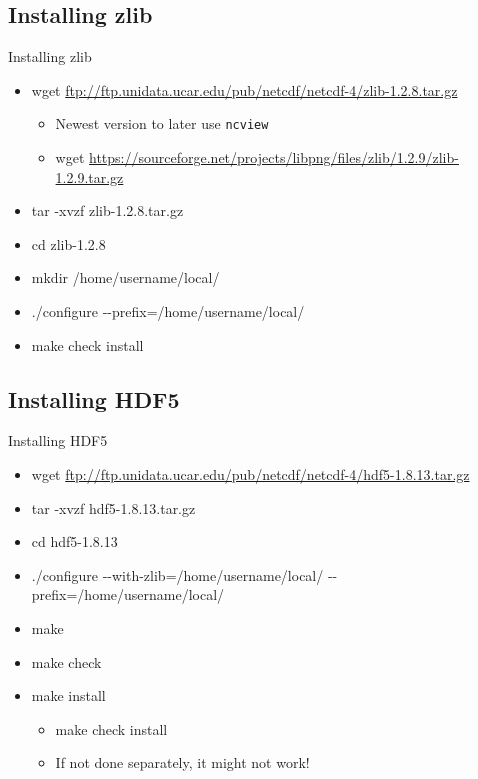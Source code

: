 \documentclass[compress,11pt,xcolor=svgnames,aspectratio=169]{beamer}
\begin{document}
\subsection{Installing zlib}

\begin{frame}[fragile]{Installing zlib}

\begin{itemize}
\setlength\itemsep{0.3cm}

  \item {\footnotesize wget \url{ftp://ftp.unidata.ucar.edu/pub/netcdf/netcdf-4/zlib-1.2.8.tar.gz}}
  \begin{itemize}
    \item Newest version to later use \texttt{ncview}
    \item {\scriptsize wget \url{https://sourceforge.net/projects/libpng/files/zlib/1.2.9/zlib-1.2.9.tar.gz}}
  \end{itemize}
  \item tar -xvzf zlib-1.2.8.tar.gz
  \item cd zlib-1.2.8
  \item mkdir /home/username/local/
  \item ./configure {-}{-}prefix=/home/username/local/
  \item make check install

\end{itemize}

\end{frame}

\subsection{Installing HDF5}

\begin{frame}[fragile]{Installing HDF5}

\begin{itemize}
\setlength\itemsep{0.3cm}

  \item {\footnotesize wget \url{ftp://ftp.unidata.ucar.edu/pub/netcdf/netcdf-4/hdf5-1.8.13.tar.gz}}
  \item tar -xvzf hdf5-1.8.13.tar.gz
  \item cd hdf5-1.8.13
  \item ./configure {-}{-}with-zlib=/home/username/local/ {-}{-}prefix=/home/username/local/
  \item make
  \item make check
  \item make install
  \begin{itemize}
    \item make check install
    \item If not done separately, it might not work!
  \end{itemize}
\end{itemize}

\end{frame}
\end{document}
